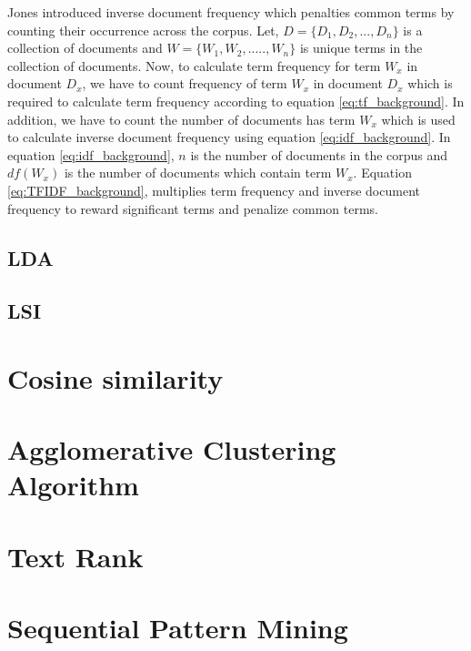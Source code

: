 Jones \cite{jones1972statistical} introduced inverse document frequency which penalties common terms by counting their occurrence across the corpus. Let, $D = \{D_1, D_2, ..., D_n\}$ is a collection of documents and $W = \{W_1, W_2, ....., W_n\}$ is unique terms in the collection of documents. Now, to calculate term frequency for term $W_x$ in document $D_x$, we have to count frequency of term $W_x$ in  document $D_x$ which is required to calculate term frequency according to equation \ref{eq:tf_background}. In addition, we have to count the number of documents has term $W_x$ which is used to calculate inverse document frequency using equation \ref{eq:idf_background}. In equation \ref{eq:idf_background}, $n$ is the number of documents in the corpus and $df(W_x)$ is the number of documents which contain term $W_x$. Equation \ref{eq:TFIDF_background}, multiplies term frequency and inverse document frequency to reward significant terms and penalize common terms. 


\subsection{LDA}
\subsection{LSI}
\section{Cosine similarity}
\section{Agglomerative Clustering Algorithm}
\section{Text Rank}
\section{Sequential Pattern Mining}